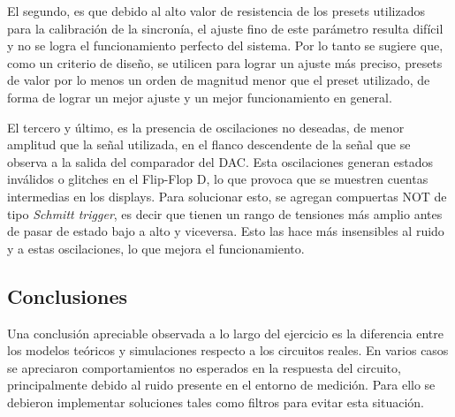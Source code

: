 El segundo, es que debido al alto valor de resistencia de los presets utilizados para la calibraci\'on de la sincron\'ia, el ajuste fino de este par\'ametro resulta dif\'icil y no se logra el funcionamiento perfecto del sistema. Por lo tanto se sugiere que, como un criterio de dise\~no, se utilicen para lograr un ajuste m\'as preciso, presets de valor por lo menos un orden de magnitud menor que el preset utilizado, de forma de lograr un mejor ajuste y un mejor funcionamiento en general.

El tercero y \'ultimo, es la presencia de oscilaciones no deseadas, de menor amplitud que la se\~nal utilizada, en el flanco descendente de la se\~nal que se observa a la salida del comparador del DAC. Esta oscilaciones generan estados inv\'alidos o glitches en el Flip-Flop D, lo que provoca que se muestren cuentas intermedias en los displays. Para solucionar esto, se agregan compuertas NOT de tipo \textit{Schmitt trigger}, es decir que tienen un rango de tensiones m\'as amplio antes de pasar de estado bajo a alto y viceversa. Esto las hace m\'as insensibles al ruido y a estas oscilaciones, lo que mejora el funcionamiento.


\subsection{Conclusiones}
 Una conclusi\'on apreciable observada a lo largo del ejercicio es la diferencia entre los modelos te\'oricos y simulaciones respecto a los circuitos reales. En varios casos se apreciaron comportamientos no esperados en la respuesta del circuito, principalmente debido al ruido presente en el entorno de medici\'on. Para ello se debieron implementar soluciones tales como filtros para evitar esta situaci\'on.
